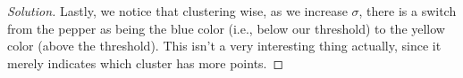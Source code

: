 \documentclass[10pt]{article}
\begin{document}
\begin{proof}[Solution]
Lastly, we notice that clustering wise, as we increase $\sigma$, there is a switch from the pepper as being the blue color (i.e., below our threshold) to the yellow color (above the threshold). This isn't a very interesting thing actually, since it merely indicates which cluster has more points. 



\end{proof}
\end{document}
